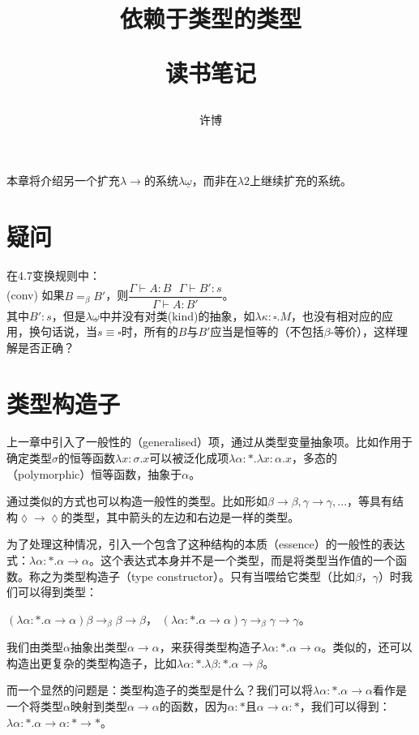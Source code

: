 \documentclass[UTF8]{article}
\title{依赖于类型的类型\\[2ex]\begin{large}读书笔记\end{large}}
\author{许博}
\date{}
\begin{document}
\maketitle
		\noindent
		本章将介绍另一个扩充$\lambda{\rightarrow}$的系统$\lambda{\underline{\omega}}$，而非在$\lambda{2}$上继续扩充的系统。
		
	\section{疑问}
		在4.7变换规则中：\\
		
		(conv) 如果$B=_\beta B'$，则$\dfrac{\Gamma\vdash A:B\ \ \ \Gamma\vdash B':s}{\Gamma\vdash A:B'}$。\\
		
		其中$B':s$，但是$\lambda{\underline{\omega}}$中并没有对类(kind)的抽象，如$\lambda\kappa:\square.M$，也没有相对应的应用，换句话说，当$s\equiv\square$时，所有的$B$与$B'$应当是恒等的（不包括$\beta$-等价），这样理解是否正确？

	\section{类型构造子}
		\noindent
		上一章中引入了一般性的（generalised）项，通过从类型变量抽象项。比如作用于确定类型$\sigma$的恒等函数$\lambda x:\sigma.x$可以被泛化成项$\lambda\alpha:*.\lambda x:\alpha.x$，多态的（polymorphic）恒等函数，抽象于$\alpha$。
		
		通过类似的方式也可以构造一般性的类型。比如形如$\beta\rightarrow\beta,\gamma\rightarrow\gamma,...$，等具有结构$\lozenge\rightarrow\lozenge$的类型，其中箭头的左边和右边是一样的类型。
		
		为了处理这种情况，引入一个包含了这种结构的本质（essence）的一般性的表达式：$\lambda\alpha:*.\alpha\rightarrow\alpha$。这个表达式本身并不是一个类型，而是将类型当作值的一个函数。称之为类型构造子（type constructor）。只有当喂给它类型（比如$\beta$，$\gamma$）时我们可以得到类型：
		
		$(\lambda\alpha:*.\alpha\rightarrow\alpha)\beta\rightarrow_\beta\beta\rightarrow\beta$，
		$(\lambda\alpha:*.\alpha\rightarrow\alpha)\gamma\rightarrow_\beta\gamma\rightarrow\gamma$。
		
		我们由类型$\alpha$抽象出类型$\alpha\rightarrow\alpha$，来获得类型构造子$\lambda\alpha:*.\alpha\rightarrow\alpha$。类似的，还可以构造出更复杂的类型构造子，比如$\lambda\alpha:*.\lambda\beta:*.\alpha\rightarrow\beta$。
		
		而一个显然的问题是：类型构造子的类型是什么？我们可以将$\lambda\alpha:*.\alpha\rightarrow\alpha$看作是一个将类型$\alpha$映射到类型$\alpha\rightarrow\alpha$的函数，因为$\alpha:*$且$\alpha\rightarrow\alpha:*$，我们可以得到：$\lambda\alpha:*.\alpha\rightarrow\alpha:*\rightarrow*$。
		
\end{document}
